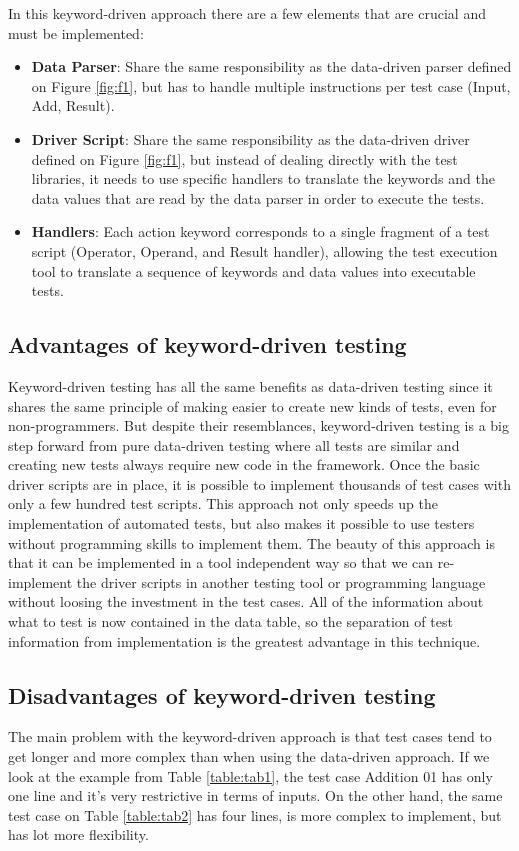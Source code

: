 In this keyword-driven approach there are a few elements that are crucial and must be implemented:
\begin{itemize}
\item \textbf{Data Parser}: Share the same responsibility as the data-driven parser defined on Figure \ref{fig:f1}, but has to handle multiple instructions per test case (Input, Add, Result).
\item \textbf{Driver Script}: Share the same responsibility as the data-driven driver defined on Figure \ref{fig:f1}, but instead of dealing directly with the test libraries, it needs to use specific handlers to translate the keywords and the data values that are read by the data parser in order to execute the tests.
\item \textbf{Handlers}: Each action keyword corresponds to a single fragment of a test script (Operator, Operand, and Result handler), allowing the test execution tool to translate a sequence of keywords and data values into executable tests.
\end{itemize}

\subsection{Advantages of keyword-driven testing}

Keyword-driven testing has all the same benefits as data-driven testing since it
shares the same principle of making easier to create new kinds of tests, even
for non-programmers. But despite their resemblances, keyword-driven testing is
a big step forward from pure data-driven testing where all tests are similar and
creating new tests always require new code in the framework. Once the basic
driver scripts are in  place, it is possible to implement thousands of test
cases with only a few hundred test scripts. This approach not only speeds up the
implementation of automated tests, but also makes it possible to use testers
without programming skills to implement them. The beauty of this approach is
that it can be implemented in a tool independent way so that we can re-implement
the driver scripts in another testing tool or programming language without
loosing the investment in the test cases. All of the information about what to
test is now contained in the data table, so the separation of test information
from implementation is the greatest advantage in this technique.

\subsection{Disadvantages of keyword-driven testing}

The main problem with the keyword-driven approach is that test cases tend to get
longer and more complex than when using the data-driven approach. If we look at
the example from Table \ref{table:tab1}, the test case Addition 01 has only
one line and it's very restrictive in terms of inputs. On the other hand, the
same test case on Table \ref{table:tab2} has four lines, is more complex to
implement, but has lot more flexibility.